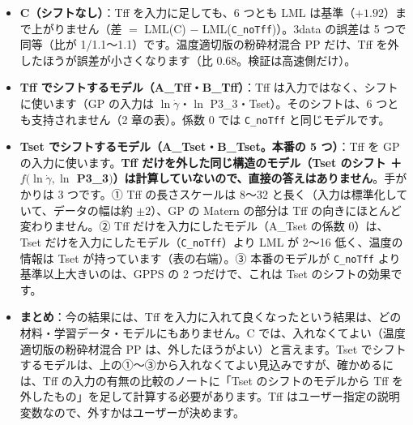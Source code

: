 \documentclass[paper=a4paper,landscape,fontsize=10pt,line_length=62zw,number_of_lines=34]{jlreq}
\let\origtextbf\textbf
\renewcommand{\textbf}[1]{\origtextbf{\gtfamily #1}}   %
\begin{document}
\begin{itemize}[itemsep=0.2ex,topsep=0.3ex]
\item \textbf{C（シフトなし）}：Tff を入力に足しても、6 つとも LML は基準（$+1.92$）まで上がりません（差 $= $ LML(C) $-$ LML(\texttt{C\_\allowbreak{}noTff})）。3data の誤差は 5 つで同等（比が 1/1.1〜1.1）です。温度適切版の粉砕材混合 PP だけ、Tff を外したほうが誤差が小さくなります（比 0.68。検証は高速側だけ）。
\item \textbf{Tff でシフトするモデル（A\_Tff・B\_Tff）}：Tff は入力ではなく、シフトに使います（GP の入力は $\ln\dot\gamma$・$\ln$ P3\_3・Tset）。そのシフトは、6 つとも支持されません（2 章の表）。係数 0 では \texttt{C\_\allowbreak{}noTff} と同じモデルです。
\item \textbf{Tset でシフトするモデル（A\_Tset・B\_Tset。本番の 5 つ）}：Tff を GP の入力に使います。\textbf{Tff だけを外した同じ構造のモデル（Tset のシフト ＋ $f(\ln\dot\gamma, \ln$ P3\_3$)$）は計算していないので、直接の答えはありません}。手がかりは 3 つです。① Tff の長さスケールは 8〜32 と長く（入力は標準化していて、データの幅は約 $\pm2$）、GP の Matern の部分は Tff の向きにほとんど変わりません。② Tff だけを入力にしたモデル（A\_Tset の係数 0）は、Tset だけを入力にしたモデル（\texttt{C\_\allowbreak{}noTff}）より LML が 2〜16 低く、温度の情報は Tset が持っています（表の右端）。③ 本番のモデルが \texttt{C\_\allowbreak{}noTff} より基準以上大きいのは、GPPS の 2 つだけで、これは Tset のシフトの効果です。
\item \textbf{まとめ}：今の結果には、Tff を入力に入れて良くなったという結果は、どの材料・学習データ・モデルにもありません。C では、入れなくてよい（温度適切版の粉砕材混合 PP は、外したほうがよい）と言えます。Tset でシフトするモデルは、上の①〜③から入れなくてよい見込みですが、確かめるには、Tff の入力の有無の比較のノートに「Tset のシフトのモデルから Tff を外したもの」を足して計算する必要があります。Tff はユーザー指定の説明変数なので、外すかはユーザーが決めます。
\end{itemize}
\end{document}
